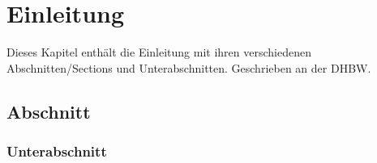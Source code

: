 \chapter{Einleitung}

Dieses Kapitel enthält die Einleitung mit ihren verschiedenen Abschnitten/Sections und
Unterabschnitten. Geschrieben an der \ac{DHBW}.

\section{Abschnitt}


\subsection{Unterabschnitt}

\lipsum 